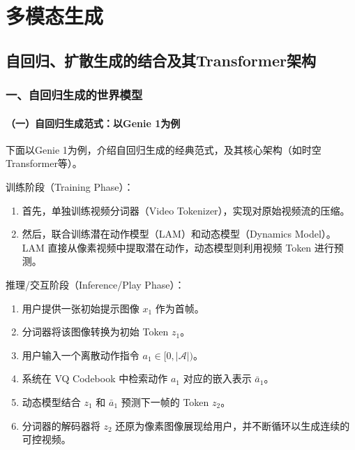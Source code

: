 \hypertarget{ux591aux6a21ux6001ux751fux6210}{%
\chapter{多模态生成}\label{ux591aux6a21ux6001ux751fux6210}}

\hypertarget{ux81eaux56deux5f52ux6269ux6563ux751fux6210ux7684ux7ed3ux5408ux53caux5176transformerux67b6ux6784}{%
\section{自回归、扩散生成的结合及其Transformer架构}\label{ux81eaux56deux5f52ux6269ux6563ux751fux6210ux7684ux7ed3ux5408ux53caux5176transformerux67b6ux6784}}

\hypertarget{ux4e00ux81eaux56deux5f52ux751fux6210ux7684ux4e16ux754cux6a21ux578b}{%
\subsection{一、自回归生成的世界模型}\label{ux4e00ux81eaux56deux5f52ux751fux6210ux7684ux4e16ux754cux6a21ux578b}}

\hypertarget{ux4e00ux81eaux56deux5f52ux751fux6210ux8303ux5f0fux4ee5genie-1ux4e3aux4f8b}{%
\subsubsection{（一）自回归生成范式：以Genie 1为例}\label{ux4e00ux81eaux56deux5f52ux751fux6210ux8303ux5f0fux4ee5genie-1ux4e3aux4f8b}}

下面以Genie 1为例，介绍自回归生成的经典范式，及其核心架构（如时空Transformer等）。

训练阶段（Training Phase）：

\begin{enumerate}
\def\labelenumi{\arabic{enumi}.}
\item
  首先，单独训练视频分词器（Video Tokenizer），实现对原始视频流的压缩。
\item
  然后，联合训练潜在动作模型（LAM）和动态模型（Dynamics Model）。LAM 直接从像素视频中提取潜在动作，动态模型则利用视频 Token 进行预测。
\end{enumerate}

推理/交互阶段（Inference/Play Phase）：

\begin{enumerate}
\def\labelenumi{\arabic{enumi}.}
\item
  用户提供一张初始提示图像 \(x_1\) 作为首帧。
\item
  分词器将该图像转换为初始 Token \(z_1\)。
\item
  用户输入一个离散动作指令 \(a_1\in[0,|\mathcal{A}|)\)。
\item
  系统在 VQ Codebook 中检索动作 \(a_1\) 对应的嵌入表示 \(\bar{a}_1\)。
\item
  动态模型结合 \(z_1\) 和 \(\bar{a}_1\) 预测下一帧的 Token \(z_2\)。
\item
  分词器的解码器将 \(z_2\) 还原为像素图像展现给用户，并不断循环以生成连续的可控视频。
\end{enumerate}


